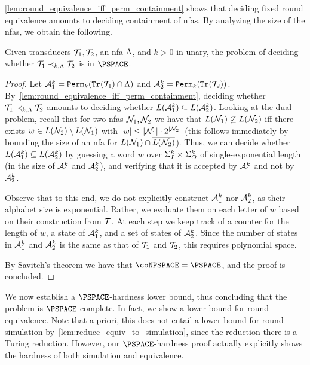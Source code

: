 \autoref{lem:round_equivalence_iff_perm_containment} shows that deciding fixed round equivalence amounts to deciding containment of \glspl{nfa}. By analyzing the size of the \glspl{nfa}, we obtain the following.
\begin{theorem}
	\label{thm:fixed_re_PSPACE}
	Given transducers $\mathcal{T}_1,\mathcal{T}_2$, an \gls{nfa} $\Lambda$, and $k>0$ in unary, the problem of deciding whether $\mathcal{T}_1\prec_{k,\Lambda}\mathcal{T}_2$ is in $\PSPACE$.
\end{theorem}
\begin{proof}
	Let $\mathcal{A}_1^k={\mathtt{Perm}}_k({\mathtt{Tr}}(\mathcal{T}_1)\cap \Lambda)$ and $\mathcal{A}_2^k={\mathtt{Perm}}_k({\mathtt{Tr}}(\mathcal{T}_2))$. By~\cref{lem:round_equivalence_iff_perm_containment}, deciding whether $\mathcal{T}_1\prec_{k,\Lambda} \mathcal{T}_2$ amounts to deciding whether $L(\mathcal{A}^k_1)\subseteq L(\mathcal{A}^k_2)$. Looking at the dual problem, recall that for two \glspl{nfa} $\mathcal{N}_1, \mathcal{N}_2$ we have that $L(\mathcal{N}_1)\not\subseteq L(\mathcal{N}_2)$ iff 
	there exists $w\in L(\mathcal{N}_2)\setminus L(\mathcal{N}_1)$ with $|w|\le |\mathcal{N}_1|\cdot 2^{|\mathcal{N}_2|}$ (this follows immediately by bounding the size of an \gls{nfa} for $L(\mathcal{N}_1)\cap \overline{L(\mathcal{N}_2)}$). Thus, we can decide whether $L(\mathcal{A}^k_1)\subseteq L(\mathcal{A}^k_2)$ by guessing a word $w$ over $\Sigma_{I}^k\times \Sigma_{O}^k$ of single-exponential length (in the size of $\mathcal{A}^k_1$ and $\mathcal{A}^k_2$), and verifying that it is accepted by $\mathcal{A}^k_1$ and not by $\mathcal{A}^k_2$. 
	
	Observe that to this end, we do not explicitly construct $\mathcal{A}^k_1$ nor $\mathcal{A}^k_2$, as their alphabet size is exponential. Rather, we evaluate them on each letter of $w$ based on their construction from $\mathcal{T}$. At each step we keep track of a counter for the length of $w$, a state of $\mathcal{A}^k_1$, and a set of states of $\mathcal{A}^k_2$. Since the number of states in $\mathcal{A}^k_1$ and $\mathcal{A}^k_2$ is the same as that of $\mathcal{T}_1$ and $\mathcal{T}_2$, this requires polynomial space.
	
	By Savitch's theorem we have that $\coNPSPACE=\PSPACE$, and the proof is concluded.
\end{proof}

We now establish a $\PSPACE$-hardness lower bound, thus concluding that the problem is $\PSPACE$-complete. In fact, we show a lower bound for round equivalence. Note that a priori, this does not entail a lower bound for round simulation by~\cref{lem:reduce_equiv_to_simulation}, since the reduction there is a Turing reduction. However, our $\PSPACE$-hardness proof actually explicitly shows the hardness of both simulation and equivalence.


